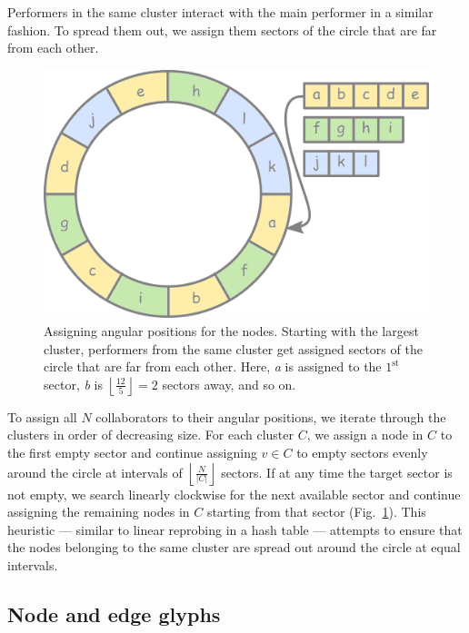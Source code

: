 \documentclass[12pt]{cmuthesis}
\begin{document}
  Performers in the same cluster interact with the main performer in a similar
  fashion. To spread them out, we assign them sectors of the circle that are far
  from each other.
  \begin{figure}[ht]
    \centering
    \includegraphics[width=\linewidth]{ordering}
    \caption{Assigning angular positions for the nodes. Starting with the largest
    cluster, performers from the same cluster get assigned sectors of the circle
    that are far from each other. Here, \emph{a} is assigned to the $1^\textrm{st}$
    sector, \emph{b} is $\left\lfloor \frac{12}{5} \right\rfloor = 2$ sectors away, and so on.}
    \label{fig:ordering}
  \end{figure}
  To assign all $N$ collaborators to their angular positions, we iterate through
  the clusters in order of decreasing size.  For each cluster $C$, we assign a
  node in $C$ to the first empty sector and continue assigning $v \in C$ to empty
  sectors evenly around the circle at intervals of
  $\left\lfloor\frac{N}{|C|}\right\rfloor$
  sectors.  If at any time the target sector is not empty, we search linearly
  clockwise for the next available sector and continue assigning the remaining
  nodes in $C$ starting from that sector (Fig.~\ref{fig:ordering}). This
  heuristic --- similar to linear reprobing in a hash table --- attempts to
  ensure that the nodes belonging to the same cluster are spread out around the
  circle at equal intervals.


  \subsection{Node and edge glyphs}
\end{document}
